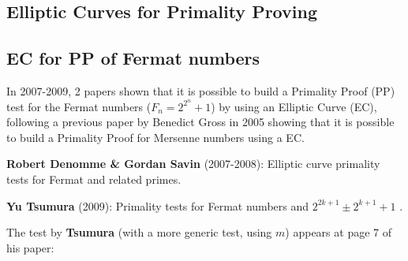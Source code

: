 \documentclass[latin1]{quadrature}
\newif\ifenfrancais
\begin{document}
\begin{article}
\begin{article}
\ifenfrancais
\section{ Courbes Elliptiques pour la Preuve de Primalit\'e }
\else
\section{ Elliptic Curves for Primality Proving }
\fi

\ifenfrancais
\subsection {CE pour PP des nombres de Fermat }
\else
\subsection { EC for PP of Fermat numbers }
\fi

\ifenfrancais
En 2007-2008, 2 articles ont d\'emontr\'e qu'il est possible de construire une Preuve de Primalit\'e (PP) pour les nombres de Fermat ($ F_n = 2^{2^n}+1$) en utilisant la m\'ethode des Courbes Elliptiques (CE), faisant suite \`a un article de Benedict Gross en 2005 qui avait montr\'e qu'il est possible de construite une Preuve de Primalit\'e des nombres de Mersenne au moyen des Courbes Elliptiques.
\else
In 2007-2009, 2 papers shown that it is possible to build a Primality Proof (PP) test for the Fermat numbers ($ F_n = 2^{2^n}+1$) by using an Elliptic Curve (EC), following a previous paper by Benedict Gross in 2005 showing that it is possible to build a Primality Proof for Mersenne numbers using a EC.
\fi

\textbf{Robert Denomme \& Gordan Savin} (2007-2008):
Elliptic curve primality tests for Fermat and related primes.  \cite{Denomme-Savin}
 
\textbf{Yu Tsumura} (2009):
Primality tests for Fermat numbers  and $2^{2k+1} \pm 2^{k+1} + 1$ . \cite{Tsumura}

\vspace{.1in}

\ifenfrancais
Le test prouv\'e par \textbf{Tsumura} (en fait un test plus g\'en\'erique, utilisant une variable $m$) appara\^it \`a la page 7 de son article :
\else
The test by \textbf{Tsumura} (with a more generic test, using $m$) appears at page 7 of his paper:
\fi

\vspace{.04in}


\end{article}
\end{article}
\end{document}
